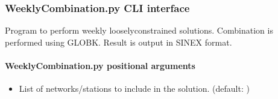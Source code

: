 \documentclass[letterpaper,10pt,english]{sphinxmanual}
\begin{document}

\begin{fulllineitems}
\label{\detokenize{parallel_gamit:parallel_gamit.WeeklyCombination.replace_in_sinex}}
\pysigstartsignatures
{}
\pysigstopsignatures
\end{fulllineitems}



\subsubsection{WeeklyCombination.py \sphinxhyphen{} CLI interface}
\label{\detokenize{parallel_gamit:WeeklyCombination.py---CLI-interface}}
\sphinxAtStartPar
Program to perform weekly loosely\sphinxhyphen{}constrained solutions. Combination is performed using GLOBK. Result is output in SINEX format.

\begin{sphinxVerbatim}[commandchars=\\\{\}]
 \PYG{p}{[}\PYG{p}{]} \PYG{p}{[} \PYG{p}{]} \PYG{p}{[} \PYG{p}{]} \PYG{p}{[}  \PYG{p}{[} \PYG{p}{]}\PYG{p}{]}
                      \PYG{p}{[} \PYG{p}{]}
\end{sphinxVerbatim}


\paragraph{WeeklyCombination.py positional arguments}
\label{\detokenize{parallel_gamit:WeeklyCombination.py-positional-arguments}}\begin{itemize}
\item {} 
\sphinxAtStartPar
{\hyperref[\detokenize{parallel_gamit:WeeklyCombination.py-all|net.stnm}]{}} \sphinxhyphen{} List of networks/stations to include in the solution. (default: )

\end{itemize}
\end{document}
